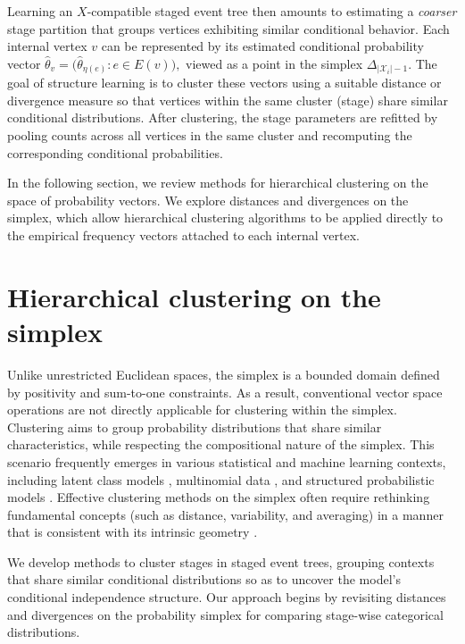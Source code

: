 \documentclass[preprint,12pt]{elsarticle}
\begin{document}
Learning an $X$-compatible staged event tree then amounts to estimating a \textit{coarser} stage partition that groups vertices exhibiting similar conditional behavior. Each internal vertex $v$ can be represented by its estimated conditional probability vector
$
\hat{\theta}_v = \bigl(\hat{\theta}_{\eta(e)} : e \in E(v)\bigr),$  
viewed as a point in the simplex $\Delta_{|\mathcal{X}_i|-1}$. The goal of structure learning is to cluster these vectors using a suitable distance or divergence measure so that vertices within the same cluster (stage) share similar conditional distributions. After clustering, the stage parameters are refitted by pooling counts across all vertices in the same cluster and recomputing the corresponding conditional probabilities.



In the following section, we review methods for hierarchical clustering on the space of probability vectors. We explore distances and divergences on the simplex, which allow hierarchical clustering algorithms to be applied directly to the empirical frequency vectors attached to each internal vertex.


\section{Hierarchical clustering on the simplex}
\label{Clus}

Unlike unrestricted Euclidean spaces, the simplex is a bounded domain defined by positivity and sum-to-one constraints. As a result, conventional vector space operations are not directly applicable for clustering within the simplex. 
Clustering aims to group probability distributions that share similar characteristics, while respecting the compositional nature of the simplex. This scenario frequently emerges in various statistical and machine learning contexts, including latent class models \cite{goodman1974exploratory}, multinomial data \cite{bishop1975discrete}, and structured probabilistic models \cite{lauritzen1996graphical}.
Effective clustering methods on the simplex often require rethinking fundamental concepts (such as distance, variability, and averaging) in a manner that is consistent with its intrinsic geometry \cite{amari2016information,aitchison1982statistical, pawlowsky2015modeling}.


We develop methods to cluster stages in staged event trees, grouping contexts that share similar conditional distributions so as to uncover the model’s conditional independence structure. Our approach begins by revisiting distances and divergences on the probability simplex for comparing stage-wise categorical distributions.
\end{document}

